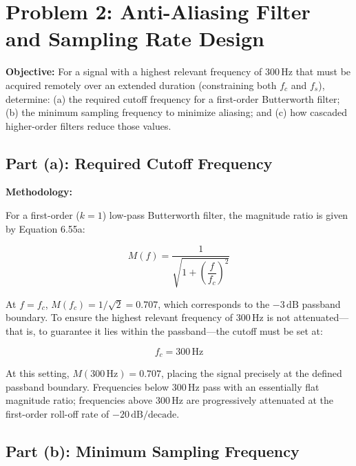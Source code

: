 \documentclass[11pt]{article}
\begin{document}
\newpage



\section*{Problem 2: Anti-Aliasing Filter and Sampling Rate Design}

\textbf{Objective:} For a signal with a highest relevant frequency of 300\,Hz that must be
acquired remotely over an extended duration (constraining both $f_c$ and $f_s$), determine: (a)
the required cutoff frequency for a first-order Butterworth filter; (b) the minimum sampling
frequency to minimize aliasing; and (c) how cascaded higher-order filters reduce those values.


\subsection*{Part (a): Required Cutoff Frequency}

\textbf{Methodology:}

For a first-order ($k = 1$) low-pass Butterworth filter, the magnitude ratio is given by
Equation 6.55a:

\[
  M(f) = \frac{1}{\sqrt{1 + \left(\dfrac{f}{f_c}\right)^2}}
\]

At $f = f_c$, $M(f_c) = 1/\sqrt{2} = 0.707$, which corresponds to the $-3\,\text{dB}$ passband
boundary. To ensure the highest relevant frequency of 300\,Hz is not attenuated---that is, to
guarantee it lies within the passband---the cutoff must be set at:

\[
  \boxed{f_c = 300\,\text{Hz}}
\]

At this setting, $M(300\,\text{Hz}) = 0.707$, placing the signal precisely at the defined passband
boundary. Frequencies below 300\,Hz pass with an essentially flat magnitude ratio; frequencies
above 300\,Hz are progressively attenuated at the first-order roll-off rate of $-20\,\text{dB/decade}$.


\subsection*{Part (b): Minimum Sampling Frequency}
\end{document}
